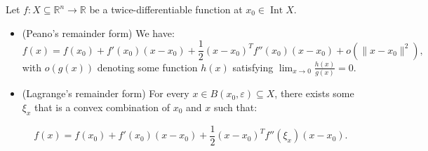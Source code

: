 \begin{theorem}
\label{thr:Multivariable Taylor's theorem}
  Let \( f: X \subseteq \mathbb{R}^{n} \to  \mathbb{R} \) be a
  twice-differentiable function at \( x_{0} \in \operatorname{Int} X \).
  \begin{itemize}
  \item (Peano's remainder form) We have:
    \[
      f(x) = f(x_{0}) + f'(x_{0})(x - x_{0}) +
      \frac{1}{2}(x-x_{0})^{T}f''(x_{0})(x-x_{0}) + o(\|x-x_{0}\|^2)
    ,\] with \( o(g(x)) \) denoting some function \( h(x) \) satisfying \( \lim_{x
    \to  0} \frac{h(x)}{g(x)} = 0 \).
  \item (Lagrange's remainder form) For every \( x \in B(x_{0}, \varepsilon)
    \subseteq X \), there exists some \( \xi_{x} \) that is a convex combination
    of \( x_{0} \) and \( x \) such that:

    \[
      f(x) = f(x_{0}) + f'(x_{0})(x - x_{0}) +
      \frac{1}{2}(x-x_{0})^{T}f''(\xi_{x})(x-x_{0})
    .\] 
  \end{itemize}
\end{theorem}


